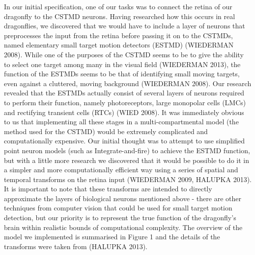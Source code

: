 \documentclass[a4paper,11pt]{article}
\begin{document}
In our initial specification, one of our tasks was to connect the retina of our dragonfly to the CSTMD neurons. Having researched how this occurs in real dragonflies, we discovered that we would have to include a layer of neurons that preprocesses the input from the retina before passing it on to the CSTMDs, named elementary small target motion detectors (ESTMD) (WIEDERMAN 2008). While one of the purposes of the CSTMD seems to be to give the ability to select one target among many in the visual field (WIEDERMAN 2013), the function of the ESTMDs seems to be that of identifying small moving targets, even against a cluttered, moving background (WIEDERMAN 2008).
\newline
\newline
Our research revealed that the ESTMDs actually consist of several layers of neurons required to perform their function, namely photoreceptors, large monopolar cells (LMCs) and rectifying transient cells (RTCs) (WIED 2008). It was immediately obvious to us that implementing all these stages in a multi-compartmental model (the method used for the CSTMD) would be extremely complicated and computationally expensive. Our initial thought was to attempt to use simplified point neuron models (such as Integrate-and-fire) to achieve the ESTMD function, but with a little more research we discovered that it would be possible to do it in a simpler and more computationally efficient way using a series of spatial and temporal transforms on the retina input (WIEDERMAN 2009, HALUPKA 2013). It is important to note that these transforms are intended to directly approximate the layers of biological neurons mentioned above - there are other techniques from computer vision that could be used for small target motion detection, but our priority is to represent the true function of the dragonfly's brain within realistic bounds of computational complexity. The overview of the model we implemented is summarised in Figure 1 and the details of the transforms were taken from (HALUPKA 2013). 
\end{document}
